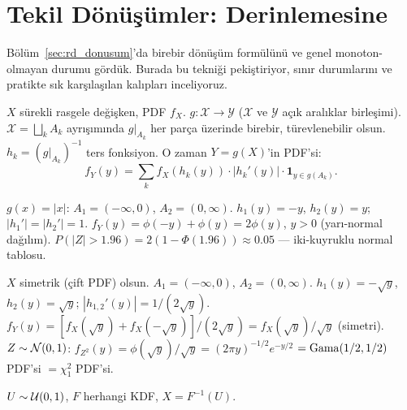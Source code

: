 \section{Tekil Dönüşümler: Derinlemesine}
\label{sec:tekil_donusum}

Bölüm~\ref{sec:rd_donusum}'da birebir dönüşüm formülünü ve genel monoton-olmayan
durumu gördük. Burada bu tekniği pekiştiriyor, sınır durumlarını ve pratikte
sık karşılaşılan kalıpları inceliyoruz.

\begin{teorem}
\label{thm:tekil_donusum}
$X$ sürekli rasgele değişken, PDF $f_X$. $g : \mathcal{X} \to \mathcal{Y}$
($\mathcal{X}$ ve $\mathcal{Y}$ açık aralıklar birleşimi). $\mathcal{X} = \bigsqcup_k A_k$
ayrışımında $g|_{A_k}$ her parça üzerinde birebir, türevlenebilir olsun.
$h_k = (g|_{A_k})^{-1}$ ters fonksiyon. O zaman $Y = g(X)$'in PDF'si:
\[
  f_Y(y) = \sum_k f_X(h_k(y)) \cdot |h_k'(y)| \cdot \mathbf{1}_{y \in g(A_k)}.
\]
\end{teorem}

\begin{ornek}[$Y = |X|$, $X \sim \Normal(0,1)$]
$g(x) = |x|$: $A_1 = (-\infty, 0)$, $A_2 = (0, \infty)$.
$h_1(y) = -y$, $h_2(y) = y$; $|h_1'| = |h_2'| = 1$.
$f_Y(y) = \phi(-y) + \phi(y) = 2\phi(y)$, $y > 0$ (yarı-normal dağılım).
$P(|Z| > 1.96) = 2(1 - \Phi(1.96)) \approx 0.05$ --- iki-kuyruklu normal tablosu.
\end{ornek}

\begin{ornek}[$Y = X^2$, $X$ simetrik]
$X$ simetrik (çift PDF) olsun. $A_1 = (-\infty,0)$, $A_2 = (0,\infty)$.
$h_1(y) = -\sqrt{y}$, $h_2(y) = \sqrt{y}$; $|h_{1,2}'(y)| = 1/(2\sqrt{y})$.
$f_Y(y) = [f_X(\sqrt{y}) + f_X(-\sqrt{y})]/(2\sqrt{y}) = f_X(\sqrt{y})/\sqrt{y}$ (simetri).
$Z \sim \mathcal{N}(0,1)$: $f_{Z^2}(y) = \phi(\sqrt{y})/\sqrt{y} = (2\pi y)^{-1/2}e^{-y/2}$
$= \operatorname{Gama}(1/2, 1/2)$ PDF'si $= \chi^2_1$ PDF'si.
\end{ornek}

\begin{ispatiskele}
$U \sim \mathcal{U}(0,1)$, $F$ herhangi KDF, $X = F^{-1}(U)$.
\end{ispatiskele}


